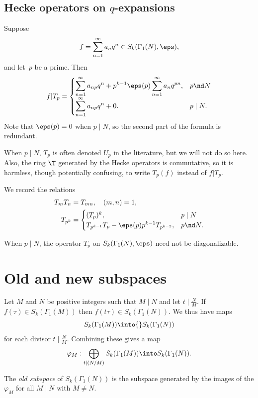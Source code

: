\documentclass{report}
\begin{document}
\subsection{Hecke operators on $q$-expansions}\label{sec:heckeqN}
Suppose
\[
  f=\sum_{n=1}^{\infty}a_n q^n \in S_k(\Gamma_1(N),\eps),
\]
and let~$p$ be a prime.
Then
\[
f|T_p = \begin{cases}
\displaystyle
\sum_{n=1}^{\infty} a_{np}q^n + p^{k-1}\eps(p)
                   \sum_{n=1}^{\infty} a_n{}q^{pn},  &p\nd N\\
\displaystyle
\sum_{n=1}^{\infty} a_{np}q^n + 0. &p\mid N.
\end{cases}
\]
Note that $\eps(p)=0$ when $p\mid N$, so the second part of the formula
is redundant.

When $p\mid{}N$, $T_p$ is often denoted $U_p$ in the literature,
but we will not do so here. Also, the ring $\T$ generated by the
Hecke operators is commutative, so it is harmless, though
potentially confusing, to write $T_p(f)$ instead of $f|T_p$.

We record the relations
\begin{align*}
T_mT_n&=T_{mn},\quad (m,n)=1,\\%
 T_{p^k}&=\begin{cases}
   (T_p)^k, & p\mid N\\
   T_{p^{k-1}}T_p - \eps(p)p^{k-1}T_{p^{k-2}}, & p\nd N.
\end{cases}
\end{align*}

 When $p\mid N$, the operator $T_p$ on
$S_k(\Gamma_1(N),\eps)$ need not be diagonalizable.


\section{Old and new subspaces}
Let $M$ and $N$ be positive integers such that $M\mid{}N$ and let
$t\mid{}\frac{N}{M}$. If $f(\tau)\in S_k(\Gamma_1(M))$ then
$f(t\tau)\in{}S_k(\Gamma_1(N))$. We thus have maps
\[
  S_k(\Gamma_1(M))\into{}S_k(\Gamma_1(N))
\]
for each divisor $t\mid \frac{N}{M}$. Combining these gives a map
\[
  \varphi_M:\bigoplus_{t\mid (N/M)}
     S_k(\Gamma_1(M))\into S_k(\Gamma_1(N)).
\]

\begin{definition} The {\em old subspace} of $S_k(\Gamma_1(N))$ is the subspace
generated by the images of the $\varphi_M$ for all $M\mid N$ with $M\neq N$.
\end{definition}
\end{document}
